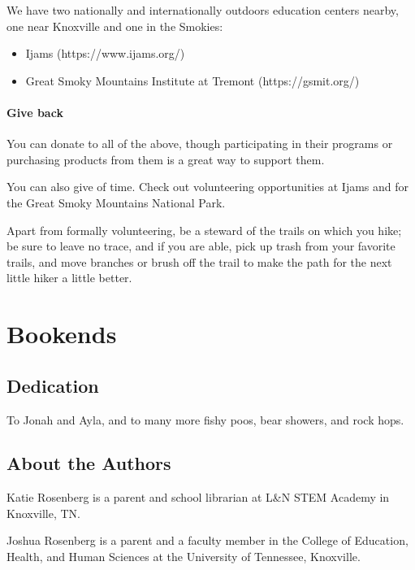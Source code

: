 \documentclass[
  letterpaper,
  DIV=11,
  numbers=noendperiod]{scrreprt}
\providecommand{\tightlist}{%
  \setlength{\itemsep}{0pt}\setlength{\parskip}{0pt}}\usepackage{longtable,booktabs,array}
\begin{document}
We have two nationally and internationally outdoors education centers
nearby, one near Knoxville and one in the Smokies:

\begin{itemize}
\tightlist
\item
  Ijams (https://www.ijams.org/)
\item
  Great Smoky Mountains Institute at Tremont (https://gsmit.org/)
\end{itemize}

\subsection{Give back}\label{give-back}

You can donate to all of the above, though participating in their
programs or purchasing products from them is a great way to support
them.

You can also give of time. Check out volunteering opportunities at Ijams
and for the Great Smoky Mountains National Park.

Apart from formally volunteering, be a steward of the trails on which
you hike; be sure to leave no trace, and if you are able, pick up trash
from your favorite trails, and move branches or brush off the trail to
make the path for the next little hiker a little better.

\part{Bookends}

\chapter{Dedication}\label{dedication}

To Jonah and Ayla, and to many more fishy poos, bear showers, and rock
hops.

\chapter{About the Authors}\label{about-the-authors}

Katie Rosenberg is a parent and school librarian at L\&N STEM Academy in
Knoxville, TN.

Joshua Rosenberg is a parent and a faculty member in the College of
Education, Health, and Human Sciences at the University of Tennessee,
Knoxville.
\end{document}
